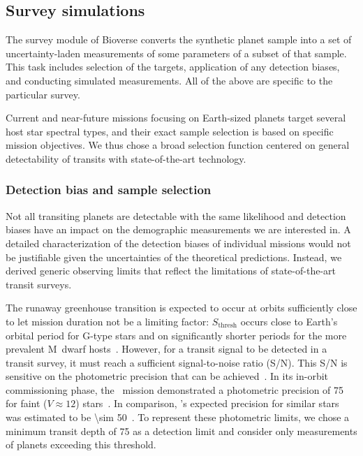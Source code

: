 \documentclass[modern]{aastex631}
\begin{document}
\subsection{Survey simulations}
\begin{note}
The survey module of Bioverse converts the synthetic planet sample into a set of uncertainty-laden measurements of some parameters of a subset of that sample.
   This task includes selection of the targets, application of any detection biases, and conducting simulated measurements.
   All of the above are specific to the particular survey.

Current and near-future missions focusing on Earth-sized planets target several host star spectral types, and their exact sample selection is based on specific mission objectives.
    We thus chose a broad selection function centered on general detectability of transits with state-of-the-art technology.

\end{note}

\subsubsection{Detection bias and sample selection}\label{sec:sensitivity}
Not all transiting planets are detectable with the same likelihood and detection biases have an impact on the demographic measurements we are interested in.
A detailed characterization of the detection biases of individual missions would not be justifiable given the uncertainties of the theoretical predictions.
Instead, we derived generic observing limits that reflect the limitations of state-of-the-art transit surveys.

The runaway greenhouse transition is expected to occur at orbits sufficiently close to let mission duration not be a limiting factor: $S_\mathrm{thresh}$ occurs close to Earth's orbital period for \mbox{G-type} stars and on significantly shorter periods for the more prevalent M~dwarf hosts~\citep{Goldblatt2012}.
However, for a transit signal to be detected in a transit survey, it must reach a sufficient signal-to-noise ratio (S/N).
This S/N is sensitive on the photometric precision that can be achieved~\citep[e.g.,][]{Burke2015,Hardegree-Ullman2019}.
In its in-orbit commissioning phase, the \cheops\ mission demonstrated a photometric precision of \SI{75}{\ppm} for faint ($V\approx 12$) stars~\citep{Benz2021}.
In comparison, \plato's expected precision for similar stars was estimated to be \SI{\sim 50}{\ppm}~\citep[][Matuszewski et al., in prep.]{plato2017}.
To represent these photometric limits, we chose a minimum transit depth of \SI{75}{\ppm} as a detection limit and consider only measurements of planets exceeding this threshold.
\end{document}
